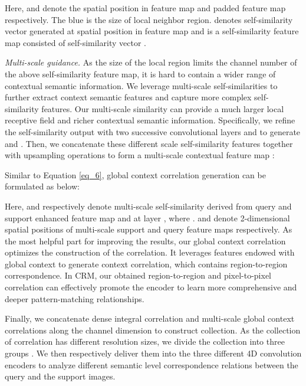 \documentclass[journal]{IEEEtran}
\begin{document}
Here,  and  denote the spatial position  in feature map  and padded feature map  respectively. The blue {} is the size of local neighbor region.  denotes self-similarity vector generated at spatial position  in feature map and  is a self-similarity feature map consisted of self-similarity vector .

\textit{Multi-scale guidance.} As the size of the local region limits the channel number of the above self-similarity feature map, it is hard to contain a wider range of contextual semantic information. We leverage multi-scale self-similarities to further extract context semantic features and capture more complex self-similarity features. Our multi-scale similarity can provide a much larger local receptive field and richer contextual semantic information. Specifically, we refine the self-similarity output  with two successive convolutional layers  and  to generate  and . Then, we concatenate these different scale self-similarity features together with upsampling operations to form a multi-scale contextual feature map :





Similar to Equation \eqref{eq_6}, global context correlation generation can be formulated as below:


Here,  and  respectively denote multi-scale self-similarity derived from query and support enhanced feature map  and  at layer , where .  and  denote 2-dimensional spatial positions of multi-scale support  and query  feature maps respectively. As the most helpful part for improving the results, our global context correlation optimizes the construction of the correlation. It leverages features endowed with global context to generate context correlation, which contains region-to-region correspondence. In CRM, our obtained region-to-region and pixel-to-pixel correlation can effectively promote the encoder to learn more comprehensive and deeper pattern-matching relationships. \par

Finally, we concatenate dense integral correlation  and multi-scale global context correlations  along the channel dimension to construct collection. As the collection of correlation has different resolution sizes, we divide the collection into three groups . We then respectively deliver them into the three different 4D convolution encoders to analyze different semantic level correspondence relations between the query and the support images.
\end{document}
